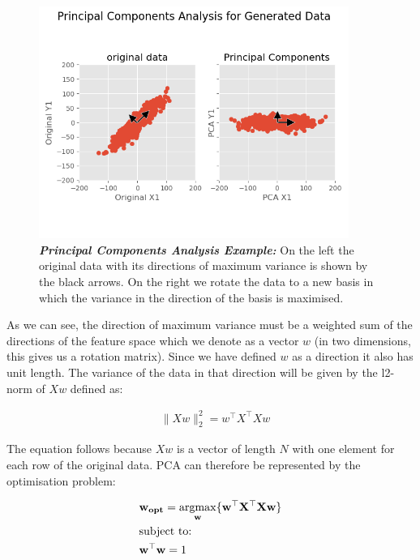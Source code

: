 \begin{figure}[H] %
    \centering %
    \includegraphics[width=0.9\textwidth]{chapters/2_background/PCA.png}
    \caption[Principal Components Analysis Example]{\textit{\textbf{Principal Components Analysis Example:}} On the left the original data with its directions of maximum variance is shown by the black arrows. On the right we rotate the data to a new basis in which the variance in the direction of the basis is maximised.}\label{fig:PCA}\end{figure}

As we can see, the direction of maximum variance must be a weighted sum of the directions of the feature space which we denote as a vector $w$ (in two dimensions, this gives us a rotation matrix). Since we have defined $w$ as a direction it also has unit length. The variance of the data in that direction will be given by the l2-norm of $Xw$ defined as:

\begin{align}
     & \|Xw\|^2_2=w^{\top}X^{\top}Xw
\end{align}

The equation follows because $Xw$ is a vector of length $N$ with one element for each row of the original data. PCA can therefore be represented by the optimisation problem:

\begin{align}
     & \bold{w_{opt}}=\underset{\bold{w}}{\mathrm{argmax}}\{\bold{w^{\top}X^{\top}}\bold{Xw}\} \\
     & \text{subject to:} \notag                                                               \\
     & \bold{w^{\top}w}=1 \notag
\end{align}

